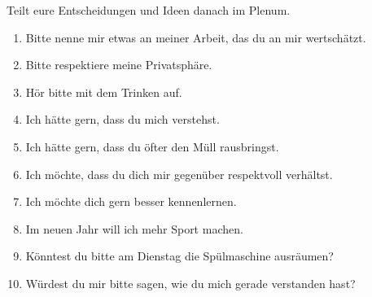 Teilt eure Entscheidungen und Ideen danach im Plenum.


\begin{enumerate}
    \item Bitte nenne mir etwas an meiner Arbeit, das du an mir wertschätzt.
    \item Bitte respektiere meine Privatsphäre.
    \item Hör bitte mit dem Trinken auf.
    \item Ich hätte gern, dass du mich verstehst.
    \item Ich hätte gern, dass du öfter den Müll rausbringst.
    \item Ich möchte, dass du dich mir gegenüber respektvoll verhältst.
    \item Ich möchte dich gern besser kennenlernen.
    \item Im neuen Jahr will ich mehr Sport machen.
    \item Könntest du bitte am Dienstag die Spülmaschine ausräumen?
    \item Würdest du mir bitte sagen, wie du mich gerade verstanden hast?
\end{enumerate}
